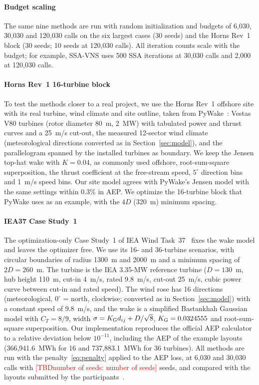 \documentclass[journal,twoside]{IEEEtran}
\newcommand{\TBD}[1]{\textcolor{red}{[TBD\ifx\relax#1\relax\else: #1\fi]}}
\begin{document}
\paragraph*{Budget scaling} The same nine methods are run with random initialization and budgets of 6,030, 30,030 and 120,030 calls on the six largest cases (30 seeds) and the Horns Rev~1 block (30 seeds; 10 seeds at 120,030 calls). All iteration counts scale with the budget; for example, SSA-VNS uses 500 SSA iterations at 30,030 calls and 2,000 at 120,030 calls.

\paragraph*{Horns Rev~1 16-turbine block} To test the methods closer to a real project, we use the Horns Rev~1 offshore site with its real turbine, wind climate and site outline, taken from PyWake~\cite{PyWake}: Vestas V80 turbines (rotor diameter 80~m, 2~MW) with tabulated power and thrust curves and a 25~m/s cut-out, the measured 12-sector wind climate (meteorological directions converted as in Section~\ref{sec:model}), and the parallelogram spanned by the installed turbines as boundary. We keep the Jensen top-hat wake with $K=0.04$, as commonly used offshore, root-sum-square superposition, the thrust coefficient at the free-stream speed, $5^\circ$ direction bins and 1~m/s speed bins. Our site model agrees with PyWake's Jensen model with the same settings within 0.3\% in AEP. We optimize the 16-turbine block that PyWake uses as an example, with the $4D$ (320~m) minimum spacing.

\paragraph*{IEA37 Case Study~1} The optimization-only Case Study~1 of IEA Wind Task~37~\cite{Baker2019,IEA37repo} fixes the wake model and leaves the optimizer free. We use its 16- and 36-turbine scenarios, with circular boundaries of radius 1300~m and 2000~m and a minimum spacing of $2D=260$~m. The turbine is the IEA 3.35-MW reference turbine ($D=130$~m, hub height 110~m, cut-in 4~m/s, rated 9.8~m/s, cut-out 25~m/s, cubic power curve between cut-in and rated speed). The wind rose has 16 directions (meteorological, $0^\circ$ = north, clockwise; converted as in Section~\ref{sec:model}) with a constant speed of 9.8~m/s, and the wake is a simplified Bastankhah Gaussian model with $C_T=8/9$, width $\sigma=K_{\rm G}d_{ij}+D/\sqrt8$, $K_{\rm G}=0.0324555$ and root-sum-square superposition. Our implementation reproduces the official AEP calculator to a relative deviation below $10^{-11}$, including the AEP of the example layouts (366,941.6~MWh for 16 and 737,883.1~MWh for 36 turbines). All methods are run with the penalty~\eqref{eq:penalty} applied to the AEP loss, at 6,030 and 30,030 calls with \TBD{number of seeds} seeds, and compared with the layouts submitted by the participants~\cite{Baker2019,IEA37repo}.
\end{document}
